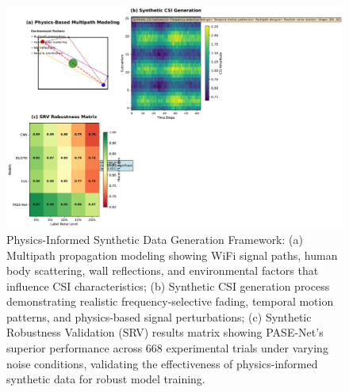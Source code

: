 \documentclass[journal]{IEEEtran}
\begin{document}
\begin{figure}[t]
\centering
\includegraphics[width=\columnwidth]{plots/fig2_physics_modeling.pdf}
\caption{Physics-Informed Synthetic Data Generation Framework: (a) Multipath propagation modeling showing WiFi signal paths, human body scattering, wall reflections, and environmental factors that influence CSI characteristics; (b) Synthetic CSI generation process demonstrating realistic frequency-selective fading, temporal motion patterns, and physics-based signal perturbations; (c) Synthetic Robustness Validation (SRV) results matrix showing PASE-Net's superior performance across 668 experimental trials under varying noise conditions, validating the effectiveness of physics-informed synthetic data for robust model training.}
\label{fig:physics_modeling}
\end{figure}
\end{document}
